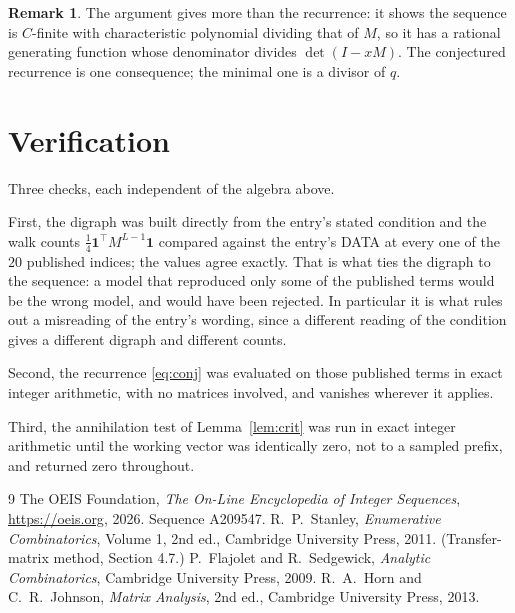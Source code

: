 \documentclass[11pt,a4paper]{article}
\theoremstyle{plain}
\theoremstyle{definition}
\newtheorem{remark}[theorem]{Remark}
\begin{document}
\begin{remark}
The argument gives more than the recurrence: it shows the sequence is $C$-finite with
characteristic polynomial dividing that of $M$, so it has a rational generating function
whose denominator divides $\det(I-xM)$. The conjectured recurrence is one consequence; the
minimal one is a divisor of $q$.
\end{remark}

\section{Verification}

Three checks, each independent of the algebra above.

First, the digraph was built directly from the entry's stated condition and the walk counts
$\tfrac1{4}\mathbf{1}^{\!\top}M^{L-1}\mathbf{1}$ compared against the entry's DATA at
every one of the $20$ published indices; the values agree exactly. That is what ties
the digraph to the sequence: a model that reproduced only some of the published terms would
be the wrong model, and would have been rejected. In particular it is what rules out a
misreading of the entry's wording, since a different reading of the condition gives a
different digraph and different counts.

Second, the recurrence \eqref{eq:conj} was evaluated on those published terms in exact
integer arithmetic, with no matrices involved, and vanishes wherever it applies.

Third, the annihilation test of Lemma~\ref{lem:crit} was run in exact integer arithmetic
until the working vector was identically zero, not to a sampled prefix, and returned zero
throughout.

\begin{thebibliography}{9}
 The OEIS Foundation, \emph{The On-Line Encyclopedia of Integer
Sequences}, \url{https://oeis.org}, 2026. Sequence A209547.
 R.~P.~Stanley, \emph{Enumerative Combinatorics}, Volume 1, 2nd ed.,
Cambridge University Press, 2011. (Transfer-matrix method, Section 4.7.)
 P.~Flajolet and R.~Sedgewick, \emph{Analytic Combinatorics}, Cambridge
University Press, 2009.
 R.~A.~Horn and C.~R.~Johnson, \emph{Matrix Analysis}, 2nd ed., Cambridge
University Press, 2013.
\end{thebibliography}
\end{document}
